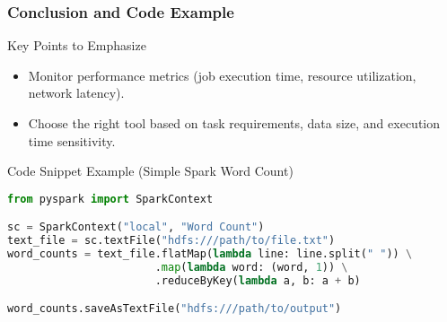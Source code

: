 \documentclass[aspectratio=169]{beamer}
\begin{document}
\begin{frame}[fragile]
    \frametitle{Conclusion and Code Example}
    \begin{block}{Key Points to Emphasize}
        \begin{itemize}
            \item Monitor performance metrics (job execution time, resource utilization, network latency).
            \item Choose the right tool based on task requirements, data size, and execution time sensitivity.
        \end{itemize}
    \end{block}

    \begin{block}{Code Snippet Example (Simple Spark Word Count)}
        \begin{lstlisting}[language=Python]
from pyspark import SparkContext

sc = SparkContext("local", "Word Count")
text_file = sc.textFile("hdfs:///path/to/file.txt")
word_counts = text_file.flatMap(lambda line: line.split(" ")) \
                       .map(lambda word: (word, 1)) \
                       .reduceByKey(lambda a, b: a + b)

word_counts.saveAsTextFile("hdfs:///path/to/output")
        \end{lstlisting}
    \end{block}
\end{frame}
\end{document}
